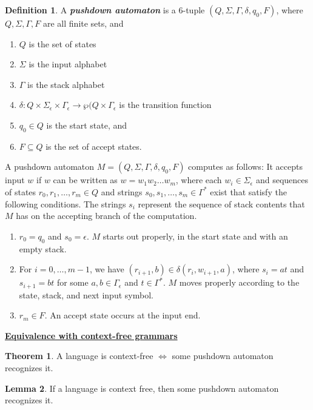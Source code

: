 \documentclass[11pt]{article}
\theoremstyle{definition}
\newtheorem{defn}{Definition}[section]
\newtheorem{thm}{Theorem}[section]
\newtheorem{lemma}[thm]{Lemma}
\begin{document}
\begin{defn}
A \textbf{\textit{pushdown automaton}} is a 6-tuple $(Q,\Sigma, \Gamma, \delta, q_0, F)$, where $Q,\Sigma, \Gamma,  F$ are all finite sets, and
\begin{enumerate}
    \item $Q$ is the set of states
    \item $\Sigma$ is the input alphabet
    \item $\Gamma$ is the stack alphabet
    \item $\delta:Q\times\Sigma_\epsilon\times \Gamma_\epsilon\to \wp(Q\times\Gamma_\epsilon$ is the transition function
    \item $q_0\in Q$ is the start state, and 
    \item $F\subseteq Q$ is the set of accept states.
\end{enumerate}
A pushdown automaton $M = (Q,\Sigma, \Gamma, \delta, q_0, F)$ computes as follows: It accepts input $w$ if $w$ can be written as $w=w_1w_2\ldots w_m$, where each $w_i\in \Sigma_\epsilon$ and sequences of states $r_0,r_1,\ldots, r_m\in Q$ and strings $s_0,s_1,\ldots,s_m\in \Gamma^*$ exist that satisfy the following conditions. The strings $s_i$ represent the sequence of stack contents that $M$ has on the accepting branch of the computation.
\begin{enumerate}
    \item $r_0 = q_0$ and $s_0 = \epsilon$. $M$ starts out properly, in the start state and with an empty stack.
    \item For $i=0,\ldots, m-1$, we have $(r_{i+1}, b)\in \delta(r_i, w_{i+1}, a)$, where $s_i = at$ and $s_{i+1} = bt$ for some $a,b\in \Gamma_\epsilon$ and $t\in\Gamma^*$. $M$ moves properly according to the state, stack, and next input symbol.
    \item $r_m\in F$. An accept state occurs at the input end.
\end{enumerate}
\end{defn}
\textbf{\underline{Equivalence with context-free grammars}}
\begin{thm}
    A language is context-free $\iff$ some pushdown automaton recognizes it.
\end{thm}
\begin{lemma}
If a language is context free, then some pushdown automaton recognizes it.
\end{lemma}
\end{document}
